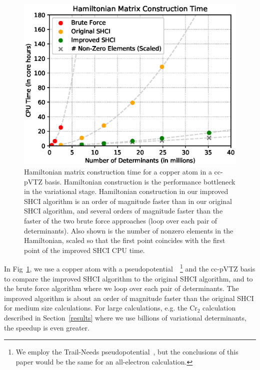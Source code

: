 \documentclass[%
reprint,
 superscriptaddress,
 amsmath,amssymb,
 aps,
]{revtex4-1}
\begin{document}
\begin{figure}
  \includegraphics[width=\linewidth]{speedup/speedup.eps}
  \caption{Hamiltonian matrix construction time for a copper atom in a cc-pVTZ basis. Hamiltonian construction is the performance bottleneck in the variational stage.
Hamiltonian construction in our improved SHCI algorithm is an order of magnitude faster than in
our original SHCI algorithm, and several orders of magnitude faster than the faster of the two brute force
approaches (loop over each pair of determinants).
Also shown is the number of nonzero elements in the Hamiltonian, scaled so that the first point coincides with
the first point of the improved SHCI CPU time.}
  \label{fig:ham}
\end{figure}

In Fig~\ref{fig:ham}, we use a copper atom with a pseudopotential~\cite{TraNee-JCP-15}~\footnote{We employ the Trail-Needs pseudopotential~\cite{TraNee-JCP-15},
but the conclusions of this paper would be the same for an all-electron calculation.}
and the cc-pVTZ basis to compare the improved SHCI algorithm to the original SHCI algorithm,
and to the brute force algorithm where we loop over each pair of determinants.
The improved algorithm
is about an order of magnitude faster than the original SHCI for medium size calculations.
For large calculations, e.g. the Cr$_2$ calculation described in Section~\ref{results}
where we use billions of variational determinants, the speedup is even greater.
\end{document}
